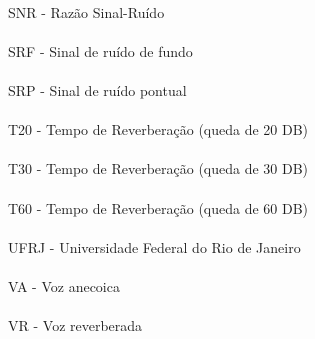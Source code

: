 \paragraph{}SNR - Razão Sinal-Ruído
\paragraph{}SRF - Sinal de ruído de fundo
\paragraph{}SRP - Sinal de ruído pontual
\paragraph{}T20 - Tempo de Reverberação (queda de 20 DB)
\paragraph{}T30 - Tempo de Reverberação (queda de 30 DB)
\paragraph{}T60 - Tempo de Reverberação (queda de 60 DB)
\paragraph{}UFRJ - Universidade Federal do Rio de Janeiro 
\paragraph{}VA - Voz anecoica
\paragraph{}VR - Voz reverberada


\pagebreak







